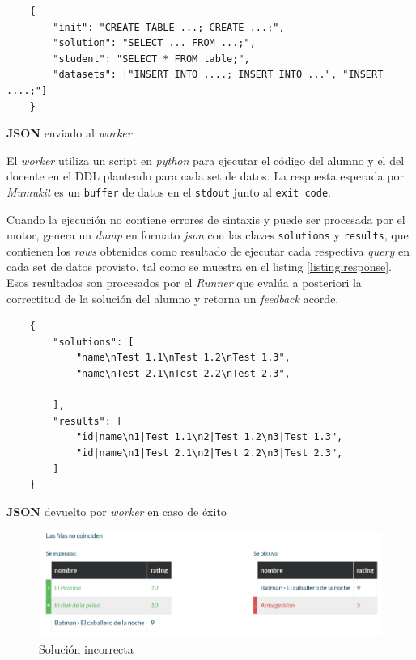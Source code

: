 \begin{listing}[ht]
    \begin{verbatim}
    {
        "init": "CREATE TABLE ...; CREATE ...;",
        "solution": "SELECT ... FROM ...;",
        "student": "SELECT * FROM table;",
        "datasets": ["INSERT INTO ....; INSERT INTO ...", "INSERT ....;"]
    }
    \end{verbatim}
    \caption{\textbf{JSON} enviado al \textit{worker}}
    \label{listing:request}
\end{listing}

El \textit{worker} utiliza un script en \textit{python}
para ejecutar el código del alumno y el del docente
en el DDL planteado para cada set de datos.
La respuesta esperada por \textit{Mumukit} es un \texttt{buffer}
de datos en el \texttt{stdout} junto al \texttt{exit code}.

Cuando la ejecución no contiene errores de sintaxis
y puede ser procesada por el motor, genera un \textit{dump} en formato \textit{json}
con las claves \texttt{solutions} y \texttt{results},
que contienen los \textit{rows} obtenidos como resultado de ejecutar
cada respectiva \textit{query} en cada set de datos provisto,
tal como se muestra en el listing \ref{listing:response}.
Esos resultados son procesados por el \textit{Runner} que evalúa
a posteriori la correctitud de la solución del alumno y
retorna un \textit{feedback} acorde.

\begin{listing}[ht]
    \begin{verbatim}
    {
        "solutions": [
            "name\nTest 1.1\nTest 1.2\nTest 1.3",
            "name\nTest 2.1\nTest 2.2\nTest 2.3",

        ],
        "results": [
            "id|name\n1|Test 1.1\n2|Test 1.2\n3|Test 1.3",
            "id|name\n1|Test 2.1\n2|Test 2.2\n3|Test 2.3",
        ]
    }
    \end{verbatim}
    \caption{\textbf{JSON} devuelto por \textit{worker} en caso de éxito}
    \label{listing:response}
\end{listing}


\begin{figure}[h]
  \centering
  \includegraphics[width=\textwidth]{img/rows-error}
  \caption{Solución incorrecta}
  \label{fig:rows-error}
\end{figure}


